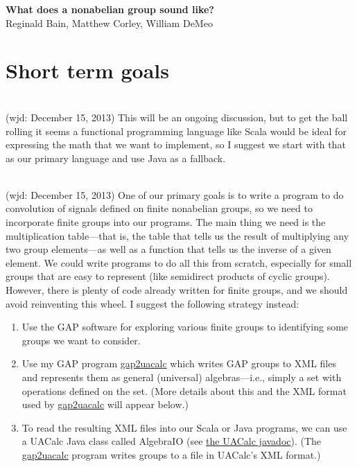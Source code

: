 \documentclass[11pt]{article}
\begin{document}
\begin{center}
{\bf What does a nonabelian group sound like?}\\
Reginald Bain, Matthew Corley, William DeMeo
\end{center}

\section{Short term goals}

\\[5pt] (wjd: December 15, 2013)
This will be an ongoing discussion, but to get the ball rolling it seems a
functional programming language like Scala would be ideal for expressing the
math that we want to implement, so I suggest we start with that as our primary
language and use Java as a fallback.  

\vskip5mm

\\[5pt] (wjd: December 15, 2013)
One of our primary goals is to write a program to do convolution of signals
defined on finite nonabelian groups, so we need to incorporate finite
groups into our programs.  
The main thing we need is the multiplication table---that is, the table that
tells us the result of multiplying any two group elements---as well as
a function that tells us the inverse of a given element.
We could write programs to do all this from scratch, especially for small groups
that are easy to represent (like semidirect products of cyclic groups).
However, there is plenty of code already written for
finite groups, and we should avoid reinventing this wheel.
I suggest the following strategy instead:
\begin{enumerate}
\item Use the \acs{GAP} software for exploring various finite groups to
  identifying some groups we want to consider.
\item Use my \acs{GAP} program
  \href{http://universalalgebra.wordpress.com/documentation/gap/gap-and-uacalc/}{gap2uacalc}
  which writes \acs{GAP} groups to \acs{XML} files and represents them as general (universal)
  algebras---i.e., simply a set with operations defined on the set. 
  (More details about this and the \acs{XML} format used by 
\href{http://universalalgebra.wordpress.com/documentation/gap/gap-and-uacalc/}{gap2uacalc}
 will appear below.)
\item To read the resulting \acs{XML} files into our Scala or Java programs,
  we can use a UACalc Java class called AlgebraIO 
  (see \href{http://uacalc.org/doc/}{the UACalc javadoc}). (The
  \href{http://universalalgebra.wordpress.com/documentation/gap/gap-and-uacalc/}{gap2uacalc}
  program writes groups to a file in UACalc's \acs{XML} format.)
\end{enumerate}
\end{document}
